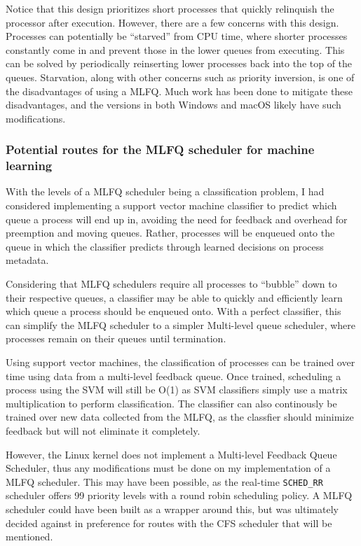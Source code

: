 \documentclass[12pt]{article}
\def\ind{\hspace*{0.3in}}
\begin{document}
Notice that this design prioritizes short processes that quickly relinquish the processor after execution. However, there are a few concerns with this design. Processes can potentially be ``starved'' from CPU time, where shorter processes constantly come in and prevent those in the lower queues from executing. This can be solved by periodically reinserting lower processes back into the top of the queues. Starvation, along with other concerns such as priority inversion, is one of the disadvantages of using a MLFQ. Much work has been done to mitigate these disadvantages, and the versions in both Windows and macOS likely have such modifications. 

\subsubsection*{Potential routes for the MLFQ scheduler for machine learning}

\ind With the levels of a MLFQ scheduler being a classification problem, I had considered implementing a support vector machine classifier to predict which queue a process will end up in, avoiding the need for feedback and overhead for preemption and moving queues. Rather, processes will be enqueued onto the queue in which the classifier predicts through learned decisions on process metadata. 

Considering that MLFQ schedulers require all processes to ``bubble'' down to their respective queues, a classifier may be able to quickly and efficiently learn which queue a process should be enqueued onto. With a perfect classifier, this can simplify the MLFQ scheduler to a simpler Multi-level queue scheduler, where processes remain on their queues until termination. 

Using support vector machines, the classification of processes can be trained over time using data from a multi-level feedback queue. Once trained, scheduling a process using the SVM will still be O(1) as SVM classifiers simply use a matrix multiplication to perform classification. The classifier can also continously be trained over new data collected from the MLFQ, as the classfier should minimize feedback but will not eliminate it completely.

However, the Linux kernel does not implement a Multi-level Feedback Queue Scheduler, thus any modifications must be done on my implementation of a MLFQ scheduler. This may have been possible, as the real-time \texttt{SCHED\_RR} scheduler offers 99 priority levels with a round robin scheduling policy. A MLFQ scheduler could have been built as a wrapper around this, but was ultimately decided against in preference for routes with the CFS scheduler that will be mentioned.
\end{document}

